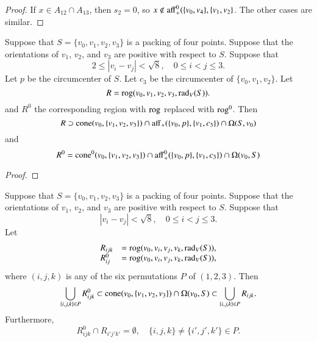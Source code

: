 \begin{tarskidata}
\begin{tarski}
\begin{proof}
If $x\in A_{12}\cap A_{13}$, then $s_2=0$, so $x\not\in{\operatorname{aff}}_+^0(\{v_0,v_4\},\{v_1,v_2\}$.  The other cases are similar.
\end{proof}
\end{tarski}





\begin{tarski}

\begin{lemma}
Suppose that $S=\{v_0,v_1,v_2,v_3\}$ is a packing
of four points.  Suppose that 
the orientations of $v_1$, $v_2$, and $v_3$ are positive with respect
to $S$.  Suppose that 
  $$
  2 \le |v_i - v_j | < \sqrt8, \quad 0\le i < j \le 3.
  $$
Let $p$ be the circumcenter of $S$.  Let $c_3$
be the circumcenter of $\{v_0,v_1,v_2\}$.
Let 
   $$
   R = {\operatorname{rog}}(v_0,v_1,v_2,v_3,\operatorname{rad}_V(S)).
   $$
and $R^0$ the corresponding region with ${\operatorname{rog}}$ replaced
with ${\operatorname{rog}}^0$.
Then 
$$
 R \supset {\operatorname{cone}}(v_0,\{v_1,v_2,v_3\})\cap
  {\operatorname{aff}}_+(\{v_0,p\},\{v_1,c_3\}) \cap
  \Omega(S,v_0)
$$ 
and 
$$
 R^0 = {\operatorname{cone}}^0(v_0,\{v_1,v_2,v_3\})\cap
  {\operatorname{aff}}^0_+(\{v_0,p\},\{v_1,c_3\}) \cap
  \Omega(v_0,S)
$$ 
\end{lemma}

\begin{proof}
\end{proof}
\end{tarski}




\begin{tarski}

\begin{lemma}
Suppose that $S=\{v_0,v_1,v_2,v_3\}$ is a packing
of four points.  Suppose that 
the orientations of $v_1$, $v_2$, and $v_3$ are positive with respect
to $S$.  Suppose that 
  $$
  |v_i - v_j | < \sqrt8, \quad 0\le i < j \le 3.
  $$
Let 
   $$
   \begin{array}{lll}
   R_{ijk} &= {\operatorname{rog}}(v_0,v_i,v_j,v_k,\operatorname{rad}_V(S)),\\
   R^0_{ij} &= {\operatorname{rog}}(v_0,v_i,v_j,v_k,\operatorname{rad}_V(S)),
   \end{array}
   $$
where $(i,j,k)$ is any of the six permutations $P$ of $(1,2,3)$.
Then
   $$
   \bigcup_{\{i,j,k\}\in P} R_{ijk}^0\subset
   {\operatorname{cone}}(v_0,\{v_1,v_2,v_3\})\cap \Omega(v_0,S) \subset
   \bigcup_{\{i,j,k\}\in P} R_{ijk}.
   $$
Furthermore,
   $$
   R_{ijk}^0 \cap R_{i'j'k'} =\emptyset,\quad
   \{i,j,k\}\ne\{i',j',k'\}\in P.
   $$
\end{lemma}


\end{tarski}
\end{tarskidata}
